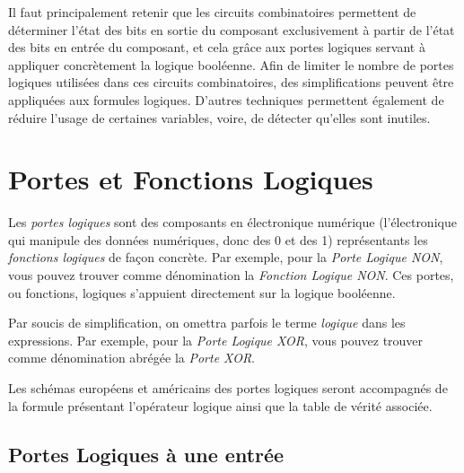 \documentclass[11pt,a4paper]{article}
\begin{document}
\bigskip

Il faut principalement retenir que les circuits combinatoires permettent de déterminer l'état des bits en sortie du composant exclusivement à partir de l'état des bits en entrée du composant, et cela grâce aux portes logiques servant à appliquer concrètement la logique booléenne.
Afin de limiter le nombre de portes logiques utilisées dans ces circuits combinatoires, des simplifications peuvent être appliquées aux formules logiques.
D'autres techniques permettent également de réduire l'usage de certaines variables, voire, de détecter qu'elles sont inutiles.


\bigskip

\vfillFirst

\vfillLast

\clearpage


\section{Portes et Fonctions Logiques}

\smallskip

Les \textit{portes logiques} sont des composants en électronique numérique (l'électronique qui manipule des données numériques, donc des 0 et des 1) représentants les \textit{fonctions logiques} de façon concrète.
Par exemple, pour la \textit{Porte Logique NON}, vous pouvez trouver comme dénomination la \textit{Fonction Logique NON}.
Ces portes, ou fonctions, logiques s'appuient directement sur la logique booléenne.

\medskip

Par soucis de simplification, on omettra parfois le terme \textit{logique} dans les expressions.
Par exemple, pour la \textit{Porte Logique XOR}, vous pouvez trouver comme dénomination abrégée la \textit{Porte XOR}.

\medskip

Les schémas européens et américains des portes logiques seront accompagnés de la formule présentant l'opérateur logique ainsi que la table de vérité associée.

\medskip

\vfillFirst


\subsection{Portes Logiques à une entrée}
\end{document}
